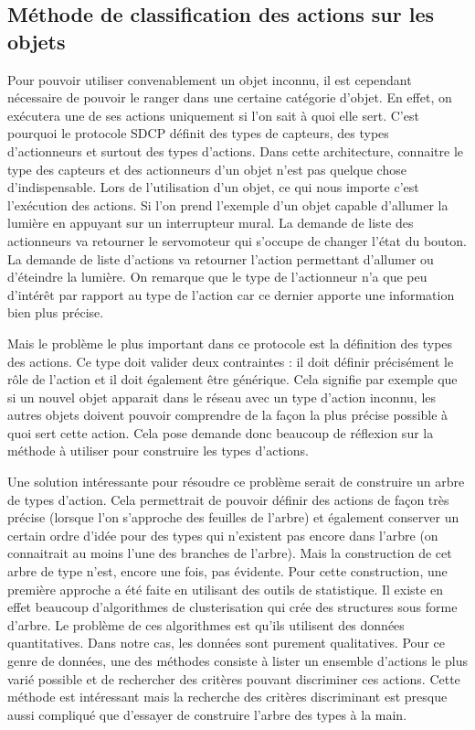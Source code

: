 	\subsection{Méthode de classification des actions sur les objets}
		Pour pouvoir utiliser convenablement un objet inconnu, il est cependant nécessaire de pouvoir
		le ranger dans une certaine catégorie d'objet. En effet, on exécutera une de ses actions 
		uniquement si l'on sait à quoi elle sert. C'est pourquoi le protocole SDCP définit des types
		de capteurs, des types d'actionneurs et surtout des types d'actions. Dans cette architecture,
		connaitre le type des capteurs et des actionneurs d'un objet n'est pas quelque chose 
		d'indispensable. Lors de l'utilisation d'un objet, ce qui nous importe c'est l'exécution 
		des actions. Si l'on prend l'exemple d'un objet capable d'allumer la lumière en appuyant 
		sur un interrupteur mural. La demande de liste des actionneurs va retourner le servomoteur
		qui s'occupe de changer l'état du bouton. La demande de liste d'actions va retourner l'action
		permettant d'allumer ou d'éteindre la lumière. On remarque que le type de l'actionneur n'a
		que peu d'intérêt par rapport au type de l'action car ce dernier apporte une information bien
		plus précise.
		
		Mais le problème le plus important dans ce protocole est la définition des types des actions.
		Ce type doit valider deux contraintes : il doit définir précisément le rôle de l'action et
		il doit également être générique. Cela signifie par exemple que si un nouvel objet
		apparait dans le réseau avec un type d'action inconnu, les autres objets doivent pouvoir 
		comprendre de la façon la plus précise possible à quoi sert cette action. Cela pose demande
		donc beaucoup de réflexion sur la méthode à utiliser pour construire les types d'actions.
		
		Une solution intéressante pour résoudre ce problème serait de construire un arbre de types
		d'action. Cela permettrait de pouvoir définir des actions de façon très précise (lorsque l'on
		s'approche des feuilles de l'arbre) et également conserver un certain ordre d'idée pour 
		des types qui n'existent pas encore dans l'arbre (on connaitrait au moins l'une des branches de
		l'arbre). Mais la construction de cet arbre de type n'est, encore une fois, pas évidente.
		Pour cette construction, une première approche a été faite en utilisant des outils de
		statistique. Il existe en effet beaucoup d'algorithmes de clusterisation qui crée des
		structures sous forme d'arbre. Le problème de ces algorithmes est qu'ils utilisent des données
		quantitatives. Dans notre cas, les données sont purement qualitatives. Pour ce genre de
		données, une des méthodes consiste à lister un ensemble d'actions le plus varié possible et
		de rechercher des critères pouvant discriminer ces actions. Cette méthode est intéressant mais
		la recherche des critères discriminant est presque aussi compliqué que d'essayer de construire
		l'arbre des types à la main.
		
